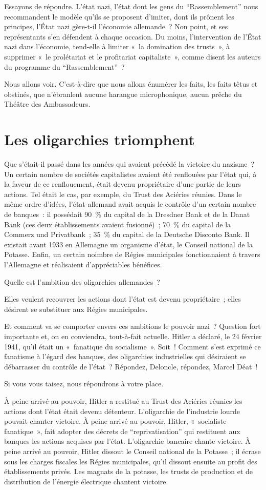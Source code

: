 \documentclass[french,twoside]{book} %
\begin{document}
Essayons de répondre. L’état nazi, l’état dont les gens du “Rassemblement” nous recommandent le modèle qu’ils se proposent d’imiter, dont ils prônent les principes, l’État nazi gère-t-il l’économie allemande ? Non point, et ses représentants s’en défendent à chaque occasion. Du moins, l’intervention de l’État nazi dans l’économie, tend-elle à limiter « la domination des trusts », à supprimer « le prolétariat et le profitariat capitaliste », comme disent les auteurs du programme du “Rassemblement” ?\par
Nous allons voir. C’est-à-dire que nous allons énumérer les faits, les faits têtus et obstinés, que n’ébranlent aucune harangue microphonique, aucun prêche du Théâtre des Ambassadeurs.
\section[Les oligarchies triomphent]{Les oligarchies triomphent}
\noindent Que s’était-il passé dans les années qui avaient précédé la victoire du nazisme ? Un certain nombre de sociétés capitalistes avaient été renflouées par l’état qui, à la faveur de ce renflouement, était devenu propriétaire d’une partie de leurs actions. Tel était le cas, par exemple, du Trust des Aciéries réunies. Dans le même ordre d’idées, l’état allemand avait acquis le contrôle d’un certain nombre de banques : il possédait 90 \% du capital de la Dresdner Bank et de la Danat Bank (ces deux établissements avaient fusionné) ; 70 \% du capital de la Commerz und Privatbank ; 35 \% du capital de la Deutsche Disconto Bank. Il existait avant 1933 en Allemagne un organisme d’état, le Conseil national de la Potasse. Enfin, un certain noimbre de Régies municipales fonctionnaient à travers l’Allemagne et réalisaient d’appréciables bénéfices.\par
Quelle est l’ambition des oligarchies allemandes ?\par
Elles veulent recouvrer les actions dont l’état est devenu propriétaire ; elles désirent se substituer aux Régies municipales.\par
Et comment va se comporter envers ces ambitions le pouvoir nazi ? Question fort importante et, on en conviendra, tout-à-fait actuelle. Hitler a déclaré, le 24 février 1941, qu’il était un « fanatique du socialisme ». Soit ! Comment s’est exprimé ce fanatisme à l’égard des banques, des oligarchies industrielles qui désiraient se débarrasser du contrôle de l’état ? Répondez, Deloncle, répondez, Marcel Déat !\par
Si vous vous taisez, nous répondrons à votre place.\par
À peine arrivé au pouvoir, Hitler a restitué au Trust des Aciéries réunies les actions dont l’état était devenu détenteur. L’oligarchie de l’industrie lourde pouvait chanter victoire. À peine arrivé au pouvoir, Hitler, « socialiste fanatique », fait adopter des décrets de “reprivatisation” qui restituent aux banques les actions acquises par l’état. L’oligarchie bancaire chante victoire. À peine arrivé au pouvoir, Hitler dissout le Conseil national de la Potasse ; il écrase sous les charges fiscales les Régies municipales, qu’il dissout ensuite au profit des établissements privés. Les magnats de la potasse, les trusts de production et de distribution de l’énergie électrique chantent victoire.
\end{document}
